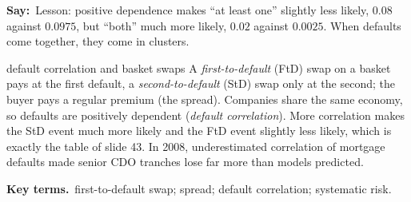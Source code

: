 \documentclass[11pt,a4paper,parskip=half]{scrartcl}
\newcommand{\terms}{\par\textbf{\color{plum}Key terms.}\ }
\newcommand{\say}{\textbf{\color{teal}Say:}\ }
\begin{document}
\say Lesson: positive dependence makes ``at least one'' slightly less
likely, $0.08$ against $0.0975$, but ``both'' much more likely, $0.02$
against $0.0025$. When defaults come together, they come in clusters.

\begin{bg}{default correlation and basket swaps}
	A \emph{first-to-default} (FtD) swap on a basket pays at the first
	default, a \emph{second-to-default} (StD) swap only at the second; the
	buyer pays a regular premium (the spread). Companies share the same
	economy, so defaults are positively dependent (\emph{default
		correlation}). More correlation makes the StD event much more likely
	and the FtD event slightly less likely, which is exactly the table of
	slide 43. In 2008, underestimated correlation of mortgage defaults made
	senior CDO tranches lose far more than models predicted.

	\terms first-to-default swap; spread; default correlation; systematic
	risk.
\end{bg}
\end{document}
